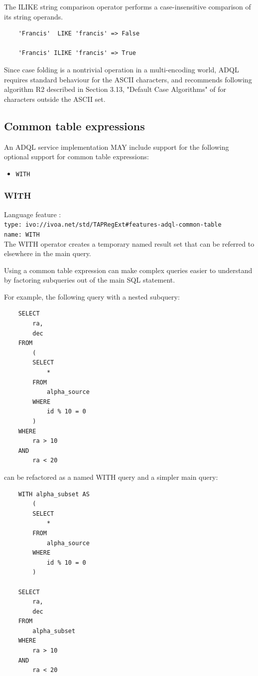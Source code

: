 \documentclass[11pt,a4paper]{ivoa}
\begin{document}
The ILIKE string comparison operator performs a case-insensitive comparison
of its string operands.

\begin{verbatim}
    'Francis'  LIKE 'francis' => False

    'Francis' ILIKE 'francis' => True
\end{verbatim}

Since case folding is a nontrivial operation in a multi-encoding world,
ADQL requires standard behaviour for the ASCII characters, and recommends
following algorithm R2 described in Section 3.13, "Default Case Algorithms"
of \citet{std:UNICODE} for characters outside the ASCII set.

\subsection{Common table expressions}
\label{sec:common-table}

An ADQL service implementation MAY include support for the following optional
support for common table expressions:

\begin{itemize}
    \item \verb:WITH:
\end{itemize}

\subsubsection{WITH}
{\footnotesize Language feature :}\\
{\footnotesize \verb|type: ivo://ivoa.net/std/TAPRegExt#features-adql-common-table|}\\
{\footnotesize \verb|name: WITH|}\\

The WITH operator creates a temporary named result set that can be referred
to elsewhere in the main query.

Using a common table expression can make complex queries easier to understand
by factoring subqueries out of the main SQL statement.

For example, the following query with a nested subquery: 
\begin{verbatim}
    SELECT
        ra,
        dec
    FROM
        (
        SELECT
            *
        FROM
            alpha_source
        WHERE
            id % 10 = 0
        )
    WHERE
        ra > 10
    AND 
        ra < 20
\end{verbatim}
\noindent
can be refactored as a named WITH query and a simpler main query:
\begin{verbatim}
    WITH alpha_subset AS
        (
        SELECT
            *
        FROM
            alpha_source
        WHERE
            id % 10 = 0
        )

    SELECT
        ra,
        dec
    FROM
        alpha_subset
    WHERE
        ra > 10
    AND 
        ra < 20
\end{verbatim}
\end{document}
